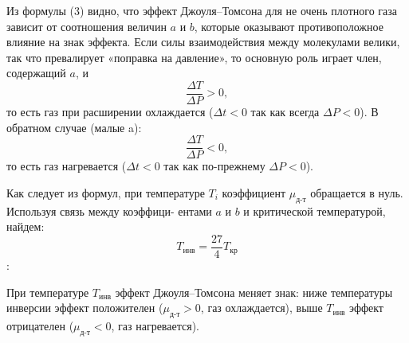 \documentclass[a4paper, 12pt]{article}%
\begin{document}
	Из формулы (3) видно, что эффект Джоуля–Томсона для не очень
	плотного газа зависит от соотношения величин $a$ и $b$, которые оказывают противоположное влияние на знак эффекта. Если силы взаимодействия между молекулами велики, так что превалирует «поправка на давление», то основную роль играет член, содержащий $a$, и
	\[
	\frac{\Delta T}{\Delta P} > 0,
	\]
	то есть газ при расширении охлаждается ($\Delta t < 0$ так как всегда
	$\Delta P < 0$). В обратном случае (малые a):
	\[
	\frac{\Delta T}{\Delta P} < 0,
	\]
	то есть газ нагревается ($\Delta t < 0$ так как по-прежнему
	$\Delta P < 0$).
	
	
	
	Как следует из формул, при температуре $T_i$ коэффициент $\mu_\text{д-т}$ обращается в нуль. Используя связь между коэффици-
	ентами $a$ и $b$ и критической температурой, найдем:
	\begin{equation}
		T_{\text{инв}}=\frac{27}{4}T_{\text{кр}}
	\end{equation}:
	
	При температуре $T_\text{инв}$ эффект Джоуля–Томсона меняет знак: ниже температуры инверсии эффект положителен ($\mu_\text{д-т} > 0$, газ охлаждается), выше $T_\text{инв}$ эффект отрицателен ($\mu_\text{д-т} < 0$, газ нагревается).	
\end{document}
